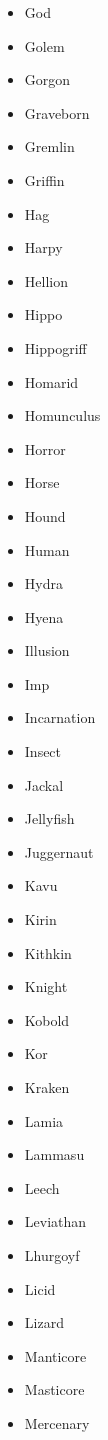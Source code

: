 \documentclass{article}
\begin{document}
\begin{multicols}{3}
\begin{itemize}
        \item God
        \item Golem
        \item Gorgon
        \item Graveborn
        \item Gremlin
        \item Griffin
        \item Hag
        \item Harpy
        \item Hellion
        \item Hippo
        \item Hippogriff
        \item Homarid
        \item Homunculus
        \item Horror
        \item Horse
        \item Hound
        \item Human
        \item Hydra
        \item Hyena
        \item Illusion
        \item Imp
        \item Incarnation
        \item Insect
        \item Jackal
        \item Jellyfish
        \item Juggernaut
        \item Kavu
        \item Kirin
        \item Kithkin
        \item Knight
        \item Kobold
        \item Kor
        \item Kraken
        \item Lamia
        \item Lammasu
        \item Leech
        \item Leviathan
        \item Lhurgoyf
        \item Licid
        \item Lizard
        \item Manticore
        \item Masticore
        \item Mercenary

\end{itemize}
\end{multicols}
\end{document}

